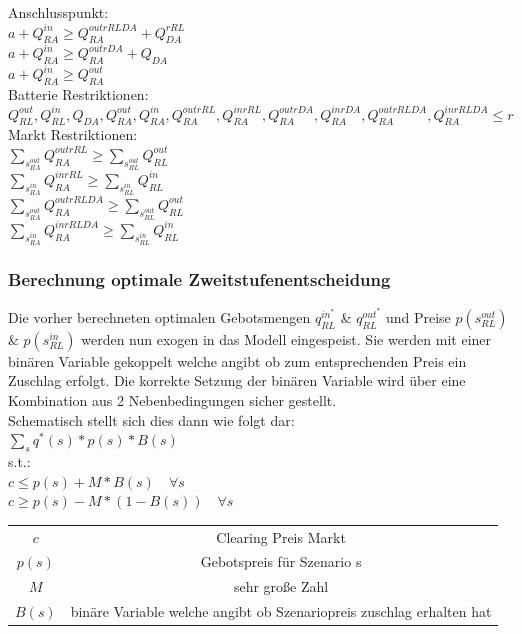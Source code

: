 \documentclass{article}
\begin{document}
Anschlusspunkt:\\
$a + Q^{in}_{RA} \geq Q^{outrRLDA}_{RA} + Q^{rRL}_{DA}$ \\
$a + Q^{in}_{RA} \geq Q^{outrDA}_{RA} + Q_{DA}$ \\
$a + Q^{in}_{RA} \geq Q^{out}_{RA}$ \\
Batterie Restriktionen:\\
$Q^{out}_{RL}, Q^{in}_{RL}, Q_{DA}, Q^{out}_{RA}, Q^{in}_{RA}, Q^{outrRL}_{RA}, Q^{inrRL}_{RA}, Q^{outrDA}_{RA}, Q^{inrDA}_{RA}, Q^{outrRLDA}_{RA}, Q^{inrRLDA}_{RA} \leq r$\\
Markt Restriktionen:\\
$\sum_{s^{out}_{RA}} Q^{outrRL}_{RA} \geq \sum_{s^{out}_{RL}} Q^{out}_{RL} $\\
$\sum_{s^{in}_{RA}} Q^{inrRL}_{RA} \geq \sum_{s^{in}_{RL}} Q^{in}_{RL} $\\
$\sum_{s^{out}_{RA}} Q^{outrRLDA}_{RA} \geq \sum_{s^{out}_{RL}} Q^{out}_{RL} $\\
$\sum_{s^{in}_{RA}} Q^{inrRLDA}_{RA} \geq \sum_{s^{in}_{RL}} Q^{in}_{RL} $\\




\subsubsection{Berechnung optimale Zweitstufenentscheidung}
Die vorher berechneten optimalen Gebotsmengen $q^{in^*}_{RL}$ \& $q^{out^*}_{RL}$ und Preise $p(s^{out}_{RL})$ \& $p(s^{in}_{RL})$  werden nun exogen in das Modell eingespeist. Sie werden mit einer binären Variable gekoppelt welche angibt ob zum entsprechenden Preis ein Zuschlag erfolgt. Die korrekte Setzung der binären Variable wird über eine Kombination aus 2 Nebenbedingungen sicher gestellt.\\
Schematisch stellt sich dies dann wie folgt dar:\\
$\sum_s q^*(s) * p(s) * B(s)$\\
s.t.:\\
$c \leq p(s) + M * B(s)\quad\forall s $ \\
$c \geq p(s) - M * (1 - B(s))\quad\forall s $ \\

\begin{tabular}{c|c}
    $c$ & Clearing Preis Markt \\
    $p(s)$ &  Gebotspreis für Szenario s \\
    $M$ & sehr große Zahl\\
    $B(s)$ & binäre Variable welche angibt ob Szenariopreis zuschlag erhalten hat\\
\end{tabular}\\
\end{document}

